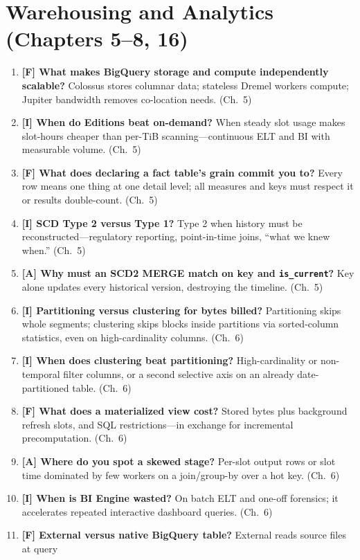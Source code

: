\section{Warehousing and Analytics (Chapters 5--8, 16)}
\begin{enumerate}
    \item \textbf{[F] What makes BigQuery storage and compute independently scalable?} Colossus
    stores columnar data; stateless Dremel workers compute; Jupiter bandwidth removes co-location
    needs. (Ch.~5)
    \item \textbf{[I] When do Editions beat on-demand?} When steady slot usage makes slot-hours
    cheaper than per-TiB scanning---continuous ELT and BI with measurable volume. (Ch.~5)
    \item \textbf{[F] What does declaring a fact table's grain commit you to?} Every row means one
    thing at one detail level; all measures and keys must respect it or results double-count.
    (Ch.~5)
    \item \textbf{[I] SCD Type 2 versus Type 1?} Type 2 when history must be
    reconstructed---regulatory reporting, point-in-time joins, ``what we knew when.'' (Ch.~5)
    \item \textbf{[A] Why must an SCD2 MERGE match on key and \texttt{is\_current}?} Key alone
    updates every historical version, destroying the timeline. (Ch.~5)
    \item \textbf{[I] Partitioning versus clustering for bytes billed?} Partitioning skips whole
    segments; clustering skips blocks inside partitions via sorted-column statistics, even on
    high-cardinality columns. (Ch.~6)
    \item \textbf{[I] When does clustering beat partitioning?} High-cardinality or non-temporal
    filter columns, or a second selective axis on an already date-partitioned table. (Ch.~6)
    \item \textbf{[F] What does a materialized view cost?} Stored bytes plus background refresh
    slots, and SQL restrictions---in exchange for incremental precomputation. (Ch.~6)
    \item \textbf{[A] Where do you spot a skewed stage?} Per-slot output rows or slot time
    dominated by few workers on a join/group-by over a hot key. (Ch.~6)
    \item \textbf{[I] When is BI Engine wasted?} On batch ELT and one-off forensics; it accelerates
    repeated interactive dashboard queries. (Ch.~6)
    \item \textbf{[F] External versus native BigQuery table?} External reads source files at query

\end{enumerate}
